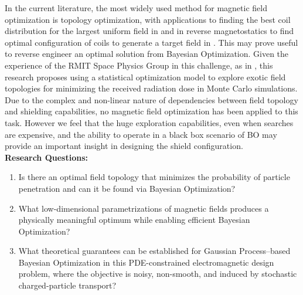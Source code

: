 \documentclass{article}
\begin{document}
	In the current literature, the most widely used method for magnetic field optimization is topology optimization, with applications to finding the best coil distribution for the largest uniform field in \cite{Thabuis2022} and in reverse magnetostatics to find optimal configuration of coils to generate a target field in \cite{KAPTANOGLU2024}. This may prove useful to reverse engineer an optimal solution from Bayesian Optimization. 
	Given the experience of the RMIT Space Physics Group in this challenge, as in \cite{Iles2021,Ng2025,LiamM}, this research proposes using a statistical optimization model to explore exotic field topologies for minimizing the received radiation dose in Monte Carlo simulations.
	Due to the complex and non-linear nature of dependencies between field topology and shielding capabilities, no magnetic field optimization has been applied to this task. However we feel that the huge exploration capabilities, even when searches are expensive, and the ability to operate in a black box scenario of BO may provide an important insight in designing the shield configuration.
	\\
	
	\textbf{Research Questions:}
	\begin{enumerate}
		\item Is there an optimal field topology that minimizes the probability of particle penetration and can it be found via Bayesian Optimization?
		\item What low-dimensional parametrizations of magnetic fields produces a physically meaningful optimum while enabling efficient Bayesian Optimization?
		\item What theoretical guarantees can be established for Gaussian Process–based Bayesian Optimization in this PDE-constrained electromagnetic design problem, where the objective is noisy, non-smooth, and induced by stochastic charged-particle transport?
	\end{enumerate}
	
\end{document}

